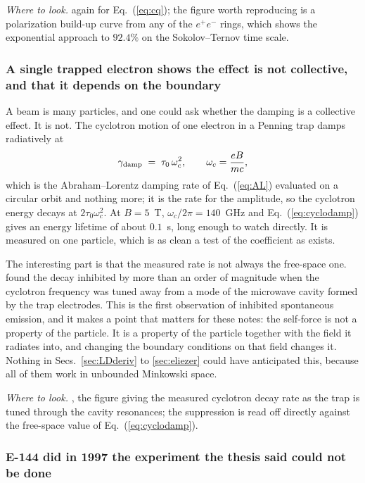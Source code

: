 \documentclass[preprint]{aastex701}
\newcommand{\taunought}{\tau_0}
\begin{document}
\emph{Where to look.} \citet{sands1970} again for Eq.~(\ref{eq:cq}); the
figure worth reproducing is a polarization build-up curve from any of the
$e^+e^-$ rings, which shows the exponential approach to $92.4\%$ on the
Sokolov--Ternov time scale.

\subsubsection{A single trapped electron shows the effect is not collective,
and that it depends on the boundary}
\label{sec:penning}

A beam is many particles, and one could ask whether the damping is a collective
effect. It is not. The cyclotron motion of one electron in a Penning trap damps
radiatively at
\begin{equation}
\gamma_{\rm damp} \;=\; \taunought\,\omega_c^2,
\qquad
\omega_c=\frac{eB}{mc},
\label{eq:cyclodamp}
\end{equation}
which is the Abraham--Lorentz damping rate of Eq.~(\ref{eq:AL}) evaluated on a
circular orbit and nothing more; it is the rate for the amplitude, so the
cyclotron energy decays at $2\taunought\omega_c^2$. At $B=5$~T,
$\omega_c/2\pi=140$~GHz and Eq.~(\ref{eq:cyclodamp}) gives an energy lifetime
of about $0.1$~s, long enough to watch directly. It is measured on one particle, which is as clean a test of the
coefficient as exists.

The interesting part is that the measured rate is not always the free-space
one. \citet{gabrielse1985} found the decay inhibited by more than an order of
magnitude when the cyclotron frequency was tuned away from a mode of the
microwave cavity formed by the trap electrodes. This is the first observation
of inhibited spontaneous emission, and it makes a point that matters for these
notes: the self-force is not a property of the particle. It is a property of
the particle together with the field it radiates into, and changing the
boundary conditions on that field changes it. Nothing in
Secs.~\ref{sec:LDderiv} to \ref{sec:eliezer} could have anticipated this, because
all of them work in unbounded Minkowski space.

\emph{Where to look.} \citet{gabrielse1985}, the figure giving the measured
cyclotron decay rate as the trap is tuned through the cavity resonances; the
suppression is read off directly against the free-space value of
Eq.~(\ref{eq:cyclodamp}).

\subsubsection{E-144 did in 1997 the experiment the thesis said could not be
done}
\label{sec:e144}
\end{document}
